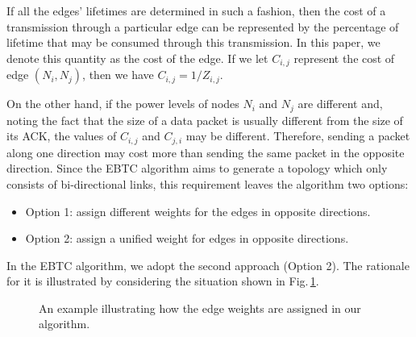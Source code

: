 \documentclass[journal,12pt,onecolumn]{IEEEtran}
\begin{document}
If all the edges' lifetimes are determined in such a fashion, then
the cost of a transmission through a particular edge can be
represented by the percentage of lifetime that may be consumed
through this transmission. In this paper, we denote this quantity as
the cost of the edge. If we let $C_{i,j}$ represent the cost of edge
$(N_i,N_j)$, then we have $C_{i,j}=1/Z_{i,j}$.

On the other hand, if the power levels of nodes $N_i$ and $N_j$ are
different and, noting the fact that the size of a data packet is
usually different from the size of its ACK, the values of $C_{i,j}$
and $C_{j,i}$ may be different. Therefore, sending a
packet along one direction may cost more than sending the same
packet in the opposite direction. Since the EBTC algorithm
aims to generate a topology which only consists of bi-directional
links, this requirement leaves the algorithm two options:
\begin{itemize}
\item Option 1: assign different weights for the edges in opposite directions.
\item Option 2: assign a unified weight for edges in opposite directions.
\end{itemize}

In the EBTC algorithm, we adopt the second approach (Option 2). The
rationale for it is illustrated by considering the situation shown in
Fig.\,\ref{fig:WeightAssignment}.


\begin{figure}[!t]
\begin{center}
    \hskip0.1in
    \hskip0.6in
     \hskip0.1in
     \hskip0.1in
    \hskip0.1in
   \caption{An example illustrating how the edge weights are assigned in our algorithm.}\label{fig:WeightAssignment}
\end{center}
\vspace{-20pt}
\end{figure}
\end{document}
